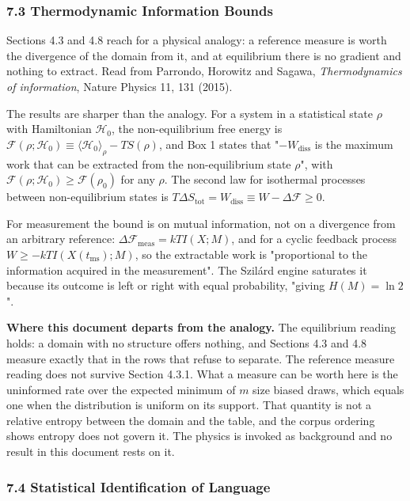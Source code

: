 \subsubsection{7.3 Thermodynamic Information Bounds}

Sections 4.3 and 4.8 reach for a physical analogy: a reference measure is worth the divergence of the domain from it, and at equilibrium there is no gradient and nothing to extract. Read from Parrondo, Horowitz and Sagawa, \emph{Thermodynamics of information}, Nature Physics 11, 131 (2015).

The results are sharper than the analogy. For a system in a statistical state \(\rho\) with Hamiltonian \(\mathcal{H}_0\), the non-equilibrium free energy is \(\mathcal{F}(\rho;\mathcal{H}_0) \equiv \langle \mathcal{H}_0\rangle_\rho - TS(\rho)\), and Box 1 states that "\(-W_{\text{diss}}\) is the maximum work that can be extracted from the non-equilibrium state \(\rho\)", with \(\mathcal{F}(\rho;\mathcal{H}_0) \ge \mathcal{F}(\rho_0)\) for any \(\rho\). The second law for isothermal processes between non-equilibrium states is \(T\Delta S_{\text{tot}} = W_{\text{diss}} \equiv W - \Delta\mathcal{F} \ge 0\).

For measurement the bound is on mutual information, not on a divergence from an arbitrary reference: \(\Delta \mathcal{F}_{\text{meas}} = kTI(X;M)\), and for a cyclic feedback process \(W \ge -kTI(X(t_{\text{ms}});M)\), so the extractable work is "proportional to the information acquired in the measurement". The Szilárd engine saturates it because its outcome is left or right with equal probability, "giving \(H(M) = \ln 2\)".

\noindent\textbf{Where this document departs from the analogy.} The equilibrium reading holds: a domain with no structure offers nothing, and Sections 4.3 and 4.8 measure exactly that in the rows that refuse to separate. The reference measure reading does not survive Section 4.3.1. What a measure can be worth here is the uninformed rate over the expected minimum of \(m\) size biased draws, which equals one when the distribution is uniform on its support. That quantity is not a relative entropy between the domain and the table, and the corpus ordering shows entropy does not govern it. The physics is invoked as background and no result in this document rests on it.

\subsubsection{7.4 Statistical Identification of Language}

